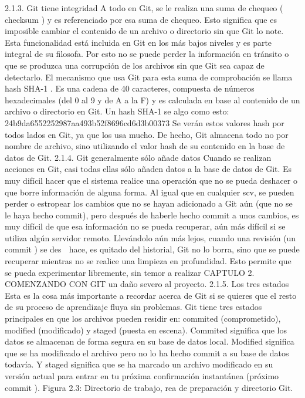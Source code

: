\documentclass[12pt, spanish, oneside, onecolumn, a4paper]{report}
\begin{document}
2.1.3. Git tiene integridad
A todo en Git, se le realiza una suma de chequeo ( checksum ) y es referenciado por esa suma de chequeo. Esto significa que es imposible cambiar el contenido de un archivo o directorio sin que Git lo note. Esta funcionalidad está incluida en Git en los más bajos niveles y es parte integral de su filosofa. Por esto no se puede perder la información en tránsito o que se produzca una corrupción de los archivos sin que Git sea capaz de detectarlo.
El mecanismo que usa Git para esta suma de comprobación se llama hash SHA-1 . Es una cadena de 40 caracteres, compuesta de números hexadecimales (del 0 al 9 y de A a la F) y es calculada en base al contenido de un archivo o directorio en Git. Un  hash SHA-1  se algo como esto:
24b9da6552252987aa493b52f8696cd6d3b00373
Se verán estos valores hash por todos lados en Git, ya que los usa mucho. De hecho, Git almacena todo no por nombre de archivo, sino utilizando el valor hash de su contenido en la base de datos de Git.
2.1.4. Git generalmente sólo añade datos
Cuando se realizan acciones en Git, casi todas ellas sólo añaden datos a la base de datos de Git. Es muy difícil hacer que el sistema realice una operación que no se pueda deshacer o que borre información de alguna forma. Al igual que en cualquier \gls{scv}, se pueden perder o estropear los cambios que no se hayan adicionado a Git aún (que no se le haya hecho commit), pero después de haberle hecho commit a unos cambios, es muy difícil de que esa información no se pueda recuperar, aún más difícil si se utiliza algún servidor remoto. Llevándolo aún más lejos, cuando una revisión (un commit ) se des  hace, es quitado del historial, Git no lo borra, sino que se puede recuperar mientras no se realice una limpieza en profundidad. Esto permite que se pueda experimentar libremente, sin temor a realizar
 CAPTULO 2. COMENZANDO CON GIT un daño severo al proyecto.
2.1.5. Los tres estados
Esta es la cosa más importante a recordar acerca de Git si se quieres que el resto de su proceso de aprendizaje fluya sin problemas. Git tiene tres estados principales en que los archivos pueden residir en: commited (comprometido), modified (modificado) y staged (puesta en escena). Commited significa que los datos se almacenan de forma segura en su base de datos local. Modified significa que se ha modificado el archivo pero no lo ha hecho commit a su base de datos todavía. Y staged significa que se ha marcado un archivo modificado en su versión actual para entrar en tu próxima confirmación instantánea (próximo commit ).
Figura 2.3: Directorio de trabajo, rea de preparación y directorio Git.
\end{document}
